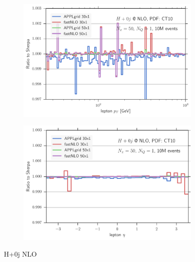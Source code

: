 \begin{figure}
\begin{subfigure}[]{0.49\textwidth}
	\includegraphics[width=\textwidth]{images/hnlo_lpt_50v30.pdf}
\end{subfigure}
\hfill
\begin{subfigure}[]{0.49\textwidth}
	\includegraphics[width=\textwidth]{images/hnlo_leta_50v30.pdf}
\end{subfigure}
\caption{H+0j NLO}
\label{fig:hnlo_validation}
\end{figure}
%
